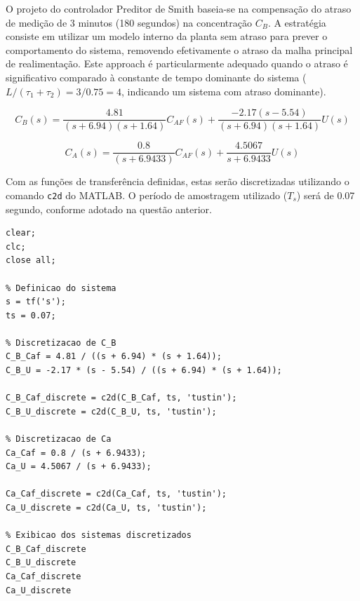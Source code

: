 \documentclass[a4paper,12pt]{article}
\begin{document}
O projeto do controlador Preditor de Smith baseia-se na compensação do atraso de medição de 3 minutos (180 segundos) na concentração $C_B$. A estratégia consiste em utilizar um modelo interno da planta sem atraso para prever o comportamento do sistema, removendo efetivamente o atraso da malha principal de realimentação. Este approach é particularmente adequado quando o atraso é significativo comparado à constante de tempo dominante do sistema ($L/(\tau_1 + \tau_2) = 3/0.75 = 4$, indicando um sistema com atraso dominante).

\begin{equation}
C_B(s) = \frac{4.81}{(s+6.94)(s+1.64)}C_{AF}(s) +\frac{-2.17(s-5.54)}{(s+6.94)(s+1.64)} U(s)
\label{eq:planta_cb}
\end{equation}

\begin{equation}
C_A(s) = \frac{0.8}{(s+6.9433)}C_{AF}(s) +\frac{4.5067}{s+6.9433} U(s)
\label{eq:planta_ca}
\end{equation}

Com as funções de transferência definidas, estas serão discretizadas utilizando o comando \texttt{c2d} do MATLAB. O período de amostragem utilizado ($T_s$) será de 0.07 segundo, conforme adotado na questão anterior.\\



\begin{lstlisting}
clear;
clc;
close all;

% Definicao do sistema
s = tf('s');
ts = 0.07;

% Discretizacao de C_B
C_B_Caf = 4.81 / ((s + 6.94) * (s + 1.64));
C_B_U = -2.17 * (s - 5.54) / ((s + 6.94) * (s + 1.64));

C_B_Caf_discrete = c2d(C_B_Caf, ts, 'tustin');
C_B_U_discrete = c2d(C_B_U, ts, 'tustin');

% Discretizacao de Ca
Ca_Caf = 0.8 / (s + 6.9433);
Ca_U = 4.5067 / (s + 6.9433);

Ca_Caf_discrete = c2d(Ca_Caf, ts, 'tustin');
Ca_U_discrete = c2d(Ca_U, ts, 'tustin');

% Exibicao dos sistemas discretizados
C_B_Caf_discrete
C_B_U_discrete
Ca_Caf_discrete
Ca_U_discrete
\end{lstlisting}
\end{document}
